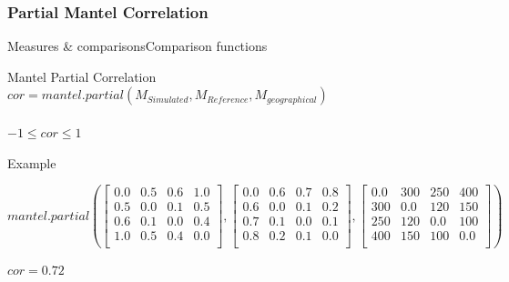 \documentclass[10pt, aspectratio=43]{beamer}
\begin{document}
\subsubsection{Partial Mantel Correlation}
\begin{frame}{Measures \& comparisons}{Comparison functions}
\begin{mblock}{0.7}{Mantel Partial Correlation}
  \centering  
  $cor = mantel.partial \left( M_{Simulated}, M_{Reference}, M_{geographical} \right)\ $\\~\\
  $-1 \le cor \le 1$
\end{mblock}
\pause
\begin{mblock}{0.7}{Example}
  \begin{center}
    \hspace*{-0.5cm}
    \fontsize{5.5pt}{8pt}
    $mantel.partial \left( \begin{bmatrix}
      0.0 & 0.5 & 0.6 & 1.0 \\
      0.5 & 0.0 & 0.1 & 0.5 \\
      0.6 & 0.1 & 0.0 & 0.4 \\
      1.0 & 0.5 & 0.4 & 0.0 \\
    \end{bmatrix}, \begin{bmatrix}
      0.0 & 0.6 & 0.7 & 0.8 \\
      0.6 & 0.0 & 0.1 & 0.2 \\
      0.7 & 0.1 & 0.0 & 0.1 \\
      0.8 & 0.2 & 0.1 & 0.0 \\
    \end{bmatrix}, \begin{bmatrix}
      0.0 & 300 & 250 & 400 \\
      300 & 0.0 & 120 & 150 \\
      250 & 120 & 0.0 & 100 \\
      400 & 150 & 100 & 0.0 \\
    \end{bmatrix} \right) $
  \end{center}
  \centering
  $cor = 0.72$
\end{mblock}
\end{frame}
\end{document}
